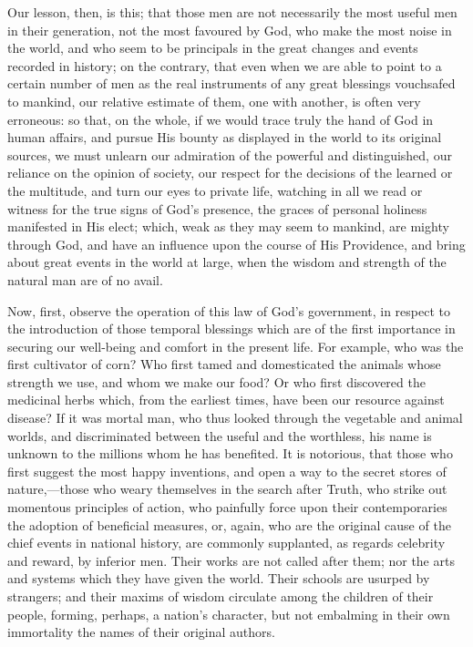 Our lesson, then, is this; that those men are not necessarily the
most useful men in their generation, not the most favoured by God, who
make the most noise in the world, and who seem to be principals in the
great changes and events recorded in history; on the contrary, that
even when we are able to point to a certain number of men as the real
instruments of any great blessings vouchsafed to mankind, our relative
estimate of them, one with another, is often very erroneous: so that,
on the whole, if we would trace truly the hand of God in human
affairs, and pursue His bounty as displayed in the world to its
original sources, we must unlearn our admiration of the powerful and
distinguished, our reliance on the opinion of society, our respect for
the decisions of the learned or the multitude, and turn our eyes to
private life, watching in all we read or witness for the true signs of
God's presence, the graces of personal holiness manifested in His
elect; which, weak as they may seem to mankind, are mighty through
God, and have an influence upon the course of His Providence, and
bring about great events in the world at large, when the wisdom and
strength of the natural man are of no avail.

Now, first, observe the operation of this law of God's government,
in respect to the introduction of those temporal blessings which are
of the first importance in securing our well-being and comfort in the
present life. For example, who was the first cultivator of corn? Who
first tamed and domesticated the animals whose strength we use, and
whom we make our food? Or who first discovered the medicinal herbs
which, from the earliest times, have been our resource against
disease? If it was mortal man, who thus looked through the vegetable
and animal worlds, and discriminated between the useful and the
worthless, his name is unknown to the millions whom he has benefited.
It is notorious, that those who first suggest the most happy
inventions, and open a way to the secret stores of nature,—those who
weary themselves in the search after Truth, who strike out momentous
principles of action, who painfully force upon their contemporaries
the adoption of beneficial measures, or, again, who are the original
cause of the chief events in national history, are commonly
supplanted, as regards celebrity and reward, by inferior men. Their
works are not called after them; nor the arts and systems which they
have given the world. Their schools are usurped by strangers; and
their maxims of wisdom circulate among the children of their people,
forming, perhaps, a nation's character, but not embalming in their own
immortality the names of their original authors.


